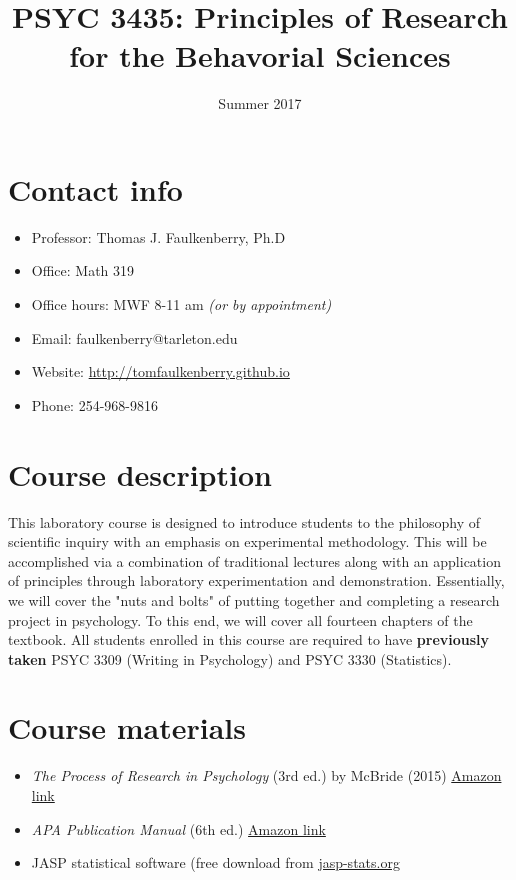 \documentclass[10pt]{article}
\date{Summer 2017}
\title{PSYC 3435: Principles of Research for the Behavorial Sciences}
\begin{document}
\maketitle

\section*{Contact info}
\label{sec-1}
\begin{itemize}
\item Professor: Thomas J. Faulkenberry, Ph.D
\item Office: Math 319
\item Office hours: MWF 8-11 am \emph{(or by appointment)}
\item Email: faulkenberry@tarleton.edu
\item Website: \url{http://tomfaulkenberry.github.io}
\item Phone: 254-968-9816
\end{itemize}

\section*{Course description}
\label{sec-2}

This laboratory course is designed to introduce students to the philosophy of 
scientific inquiry with an emphasis on experimental methodology. This will be 
accomplished via a combination of traditional lectures along with an application 
of principles through laboratory experimentation and demonstration. Essentially, 
we will cover the "nuts and bolts" of putting together and completing a research 
project in psychology. To this end, we will cover all fourteen chapters of the 
textbook. All students enrolled in this course are required to have 
\textbf{previously taken} PSYC 3309 (Writing in Psychology) and PSYC 3330 (Statistics). 

\section*{Course materials}
\label{sec-3}

\begin{itemize}
\item \emph{The Process of Research in Psychology} (3rd ed.) by McBride (2015) \href{https://www.amazon.com/Process-Research-Psychology-Dawn-McBride/dp/1483347605/}{Amazon link}
\item \emph{APA Publication Manual} (6th ed.) \href{http://www.amazon.com/Publication-Manual-American-Psychological-Association/dp/1433805618/}{Amazon link}
\item JASP statistical software (free download from \href{http://jasp-stats.org}{jasp-stats.org}
\end{itemize}
\end{document}
